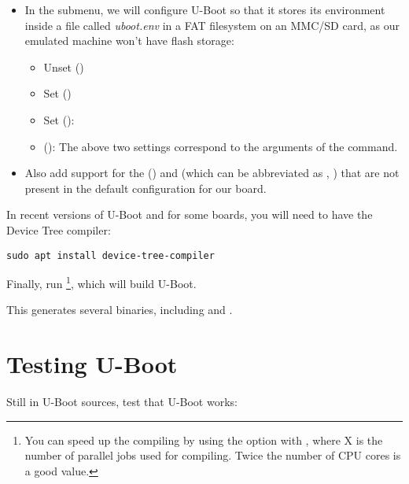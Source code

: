 \begin{itemize}
\item In the  submenu, we will configure U-Boot so
    that it stores its environment inside a file called {\em
    uboot.env} in a FAT filesystem on an MMC/SD card, as our emulated
    machine won't have flash storage:
    \begin{itemize}
    \item Unset  ()
    \item Set  ()
    \item Set  (): 
    \item {} (): \newline
        The above two settings correspond to the arguments of the
         command.
    \end{itemize}
\item Also add support for the  ()
    and  (which can be abbreviated as , )
    that are not present in the default configuration for our board.
\end{itemize}

In recent versions of U-Boot and for some boards, you will
need to have the Device Tree compiler:

\begin{verbatim}
sudo apt install device-tree-compiler
\end{verbatim}

Finally, run \footnote{You can speed up the
compiling by using the  option with , where X
is the number of parallel jobs used for compiling. Twice the
number of CPU cores is a good value.}, which will build U-Boot.

This generates several binaries, including  and
.

\section{Testing U-Boot}

Still in U-Boot sources, test that U-Boot works:

